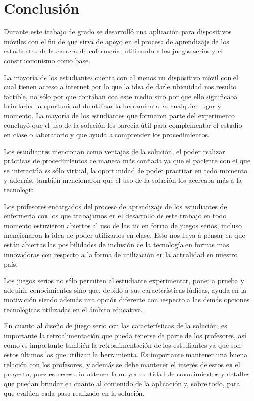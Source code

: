 \chapter{Conclusión}
\label{chap:conclusion}

Durante este trabajo de grado se desarrolló una aplicación para dispositivos
móviles con el fin de que sirva de apoyo en el proceso de aprendizaje de los
estudiantes de la carrera de enfermería, utilizando a los juegos serios y el
construccionismo como base.

La mayoría de los estudiantes cuenta con al menos un dispositivo móvil con el
cual tienen acceso a internet por lo que la idea de darle ubicuidad nos resulto
factible, no sólo por que contaban con este medio sino por que ello significaba
brindarles la oportunidad de utilizar la herramienta en cualquier lugar y
momento. La mayoría de los estudiantes que formaron parte del experimento
concluyó que el uso de la solución les parecía útil para complementar el estudio
en clase o laboratorio y que ayuda a comprender los procedimientos.

Los estudiantes mencionan como ventajas de la solución, el poder realizar
prácticas de procedimientos de manera más confiada ya que el paciente con el que
se interactúa es sólo virtual, la oportunidad de poder practicar en todo momento
y además, también mencionaron que el uso de la solución los acercaba más a la
tecnología.

Los profesores encargados del proceso de aprendizaje de los estudiantes de
enfermería con los que trabajamos en el desarrollo de este trabajo en todo
momento estuvieron abiertos al uso de las \Gls{tic} en forma de juegos serios,
incluso mencionaron la idea de poder utilizarlos en clase. Esto nos lleva a
pensar en que están abiertas las posibilidades de inclusión de la tecnología en
formas mas innovadoras con respecto a la forma de utilización en la actualidad
en nuestro país.

Los juegos serios no sólo permiten al estudiante experimentar, poner a prueba y
adquirir conocimientos sino que, debido a sus características lúdicas, ayuda en
la motivación siendo además una opción diferente con respecto a las demás
opciones tecnológicas utilizadas en el ámbito educativo.


En cuanto al diseño de juego serio con las características de la solución, es
importante la retroalimentación que pueda tenerse de parte de los profesores,
así como es importante también la retroalimentación de los estudiantes ya que
son estos últimos los que utilizan la herramienta. Es importante mantener una
buena relación con los profesores, y además se debe mantener el interés de estos
en el proyecto, pues es necesario obtener la mayor cantidad de conocimientos y
detalles que puedan brindar en cuanto al contenido de la aplicación y, sobre
todo, para que evalúen cada paso realizado en la solución.

